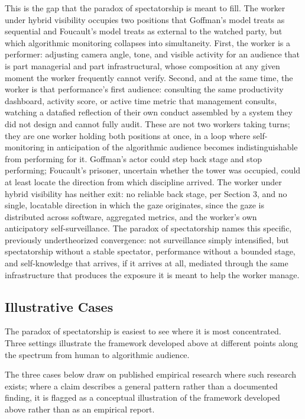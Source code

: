 \documentclass[10pt]{article}
\begin{document}
This is the gap that the paradox of spectatorship is meant to fill. The worker under hybrid visibility occupies two positions that Goffman's model treats as sequential and Foucault's model treats as external to the watched party, but which algorithmic monitoring collapses into simultaneity. First, the worker is a performer: adjusting camera angle, tone, and visible activity for an audience that is part managerial and part infrastructural, whose composition at any given moment the worker frequently cannot verify. Second, and at the same time, the worker is that performance's first audience: consulting the same productivity dashboard, activity score, or active time metric that management consults, watching a datafied reflection of their own conduct assembled by a system they did not design and cannot fully audit. These are not two workers taking turns; they are one worker holding both positions at once, in a loop where self-monitoring in anticipation of the algorithmic audience becomes indistinguishable from performing for it. Goffman's actor could step back stage and stop performing; Foucault's prisoner, uncertain whether the tower was occupied, could at least locate the direction from which discipline arrived. The worker under hybrid visibility has neither exit: no reliable back stage, per Section 3, and no single, locatable direction in which the gaze originates, since the gaze is distributed across software, aggregated metrics, and the worker's own anticipatory self-surveillance. The paradox of spectatorship names this specific, previously undertheorized convergence: not surveillance simply intensified, but spectatorship without a stable spectator, performance without a bounded stage, and self-knowledge that arrives, if it arrives at all, mediated through the same infrastructure that produces the exposure it is meant to help the worker manage.

\subsection{Illustrative Cases}

The paradox of spectatorship is easiest to see where it is most concentrated. Three settings illustrate the framework developed above at different points along the spectrum from human to algorithmic audience.

The three cases below draw on published empirical research where such research exists; where a claim describes a general pattern rather than a documented finding, it is flagged as a conceptual illustration of the framework developed above rather than as an empirical report.
\end{document}
